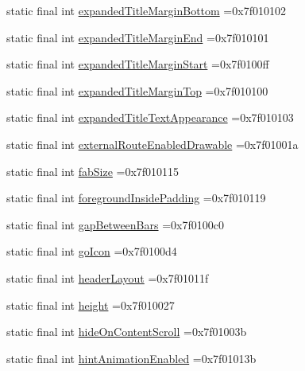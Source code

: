 \begin{DoxyCompactItemize}
\item 
static final int \hyperlink{classproject4_1_1xaria_1_1R_1_1attr_a72f3397781eabdf07e78f61d1021fa0d}{expanded\+Title\+Margin\+Bottom} =0x7f010102
\item 
static final int \hyperlink{classproject4_1_1xaria_1_1R_1_1attr_a0fd32699f56df0a95c23fad85b1d897e}{expanded\+Title\+Margin\+End} =0x7f010101
\item 
static final int \hyperlink{classproject4_1_1xaria_1_1R_1_1attr_aaf283223bf13dd58c7a2a9f92e6345f7}{expanded\+Title\+Margin\+Start} =0x7f0100ff
\item 
static final int \hyperlink{classproject4_1_1xaria_1_1R_1_1attr_a10e91e433b7cbdb102ab95bd92373df7}{expanded\+Title\+Margin\+Top} =0x7f010100
\item 
static final int \hyperlink{classproject4_1_1xaria_1_1R_1_1attr_abc26d944fa4d9a308d420006b5354bbf}{expanded\+Title\+Text\+Appearance} =0x7f010103
\item 
static final int \hyperlink{classproject4_1_1xaria_1_1R_1_1attr_ad43d16336ef0ff15f16f41327deb86cf}{external\+Route\+Enabled\+Drawable} =0x7f01001a
\item 
static final int \hyperlink{classproject4_1_1xaria_1_1R_1_1attr_a789956555161c24016c7cab1662f40f4}{fab\+Size} =0x7f010115
\item 
static final int \hyperlink{classproject4_1_1xaria_1_1R_1_1attr_ac80a0eb6b3455b8cd4bb68355de7deff}{foreground\+Inside\+Padding} =0x7f010119
\item 
static final int \hyperlink{classproject4_1_1xaria_1_1R_1_1attr_ac111bd3841ac9b65fb43125328868172}{gap\+Between\+Bars} =0x7f0100c0
\item 
static final int \hyperlink{classproject4_1_1xaria_1_1R_1_1attr_ad9505defc0256b441a407d0d133b8e6c}{go\+Icon} =0x7f0100d4
\item 
static final int \hyperlink{classproject4_1_1xaria_1_1R_1_1attr_a987af45b6d51ee04fc85ec54fd04678e}{header\+Layout} =0x7f01011f
\item 
static final int \hyperlink{classproject4_1_1xaria_1_1R_1_1attr_a26b79d8ad1413edd2eaa25ac182337b3}{height} =0x7f010027
\item 
static final int \hyperlink{classproject4_1_1xaria_1_1R_1_1attr_a63ff19873a9c03e1894c323210a00de1}{hide\+On\+Content\+Scroll} =0x7f01003b
\item 
static final int \hyperlink{classproject4_1_1xaria_1_1R_1_1attr_a3338cb578322be60aa838eabdebc9f71}{hint\+Animation\+Enabled} =0x7f01013b
\item 

\end{DoxyCompactItemize}
